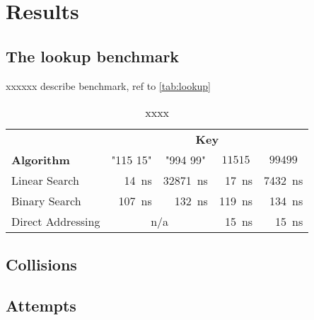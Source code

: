 \documentclass[a4paper, 11pt]{article}
\begin{document}
    \clearpage
    \section*{Results}
    \label{sec:results}
    \subsection*{The lookup benchmark}
    xxxxxx describe benchmark, ref to \autoref{tab:lookup}


    \begin{table}[h]
        \centering
        \small
\begin{tabular}{lrrrr} %
    \toprule
    & \multicolumn{4}{c}{\textbf{Key}} \\\cmidrule(lr){2-5}
    \textbf{Algorithm} & \multicolumn{1}{c}{"115 15"} &\multicolumn{1}{c}{"994 99"}& \multicolumn{1}{c}{$11515$}&\multicolumn{1}{c}{$99499$}\\
    \cmidrule(lr){1-1}
    \cmidrule(lr){2-5}
    Linear Search      &\SI{14}{\nano\second}   &\SI{32871}{\nano\second}   &\SI{17}{\nano\second}  &\SI{7432}{\nano\second}\\
    Binary Search      &\SI{107}{\nano\second}  &\SI{132}{\nano\second}     &\SI{119}{\nano\second} &\SI{134}{\nano\second} \\
    Direct Addressing  & \multicolumn{2}{c}{n/a}                       &\SI{15}{\nano\second}  &\SI{15}{\nano\second}  \\
    \bottomrule
\end{tabular}
    \caption{xxxx} %
    \label{tab:lookup} %
    \end{table}
\hline

    \subsection*{Collisions}

    \subsection*{Attempts}
\end{document}
